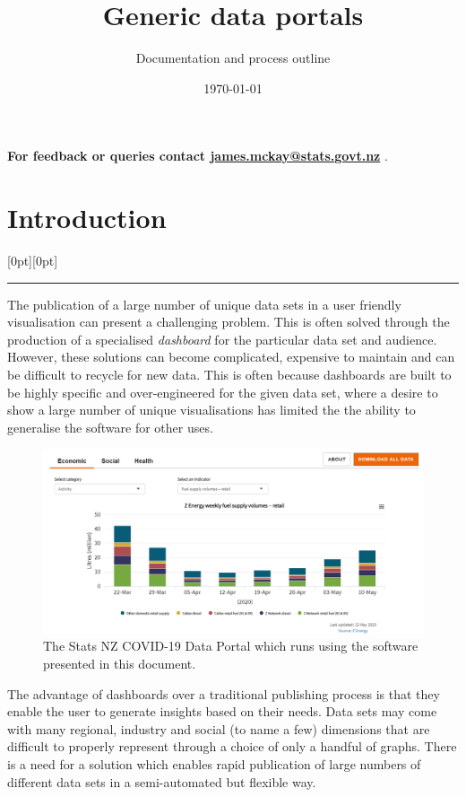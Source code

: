 \documentclass[12pt]{article}
\title{Generic data portals}
\author{Documentation and process outline}
\date{\today}
\newcommand\statssection[1]{%
  \section{{#1}}
  \raisebox{1.5em}[0pt][0pt]{\textcolor{statsorange}{\rule{0.2\textwidth}{6pt}}}
}
\begin{document}
\maketitle

\tableofcontents
\clearpage
\setcounter{page}{1}


{\center\vspace{0.25cm}}

{\center\textbf{For feedback or queries contact  \href{mailto:james.mckay@stats.govt.nz}{james.mckay@stats.govt.nz} }.}

\vspace{0.4cm}

\statssection{Introduction}

The publication of a large number of unique data sets in a user friendly visualisation can present a challenging problem.  This is often solved through the production of a specialised \textit{dashboard} for the particular data set and audience.  However, these solutions can become complicated, expensive to maintain and can be difficult to recycle for new data.  This is often because dashboards are built to be highly specific and over-engineered for the given data set, where a desire to show a large number of unique visualisations has limited the the ability to generalise the software for other uses.
\vspace{0.5cm}

\begin{figure}[h]
\centering
\includegraphics[width=\textwidth]{figures/data_portal.png}
 	\caption{The Stats NZ COVID-19 Data Portal which runs using the software presented in this document.}\label{fig:covid_19_portal}
\end{figure}

The advantage of dashboards over a traditional publishing process is that they enable the user to generate insights based on their needs.  Data sets may come with many regional, industry and social (to name a few) dimensions that are difficult to properly represent through a choice of only a handful of graphs.  There is a need for a solution which enables rapid publication of large numbers of different data sets in a semi-automated but flexible way.
\end{document}

